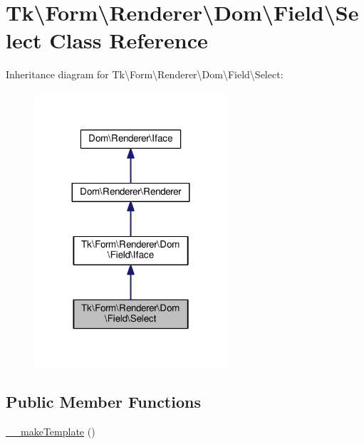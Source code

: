 \hypertarget{classTk_1_1Form_1_1Renderer_1_1Dom_1_1Field_1_1Select}{\section{Tk\textbackslash{}Form\textbackslash{}Renderer\textbackslash{}Dom\textbackslash{}Field\textbackslash{}Select Class Reference}
\label{classTk_1_1Form_1_1Renderer_1_1Dom_1_1Field_1_1Select}
}


Inheritance diagram for Tk\textbackslash{}Form\textbackslash{}Renderer\textbackslash{}Dom\textbackslash{}Field\textbackslash{}Select\+:\nopagebreak
\begin{figure}[H]
\begin{center}
\leavevmode
\includegraphics[width=203pt]{classTk_1_1Form_1_1Renderer_1_1Dom_1_1Field_1_1Select__inherit__graph}
\end{center}
\end{figure}
\subsection*{Public Member Functions}
\begin{DoxyCompactItemize}
\item 
\hyperlink{classTk_1_1Form_1_1Renderer_1_1Dom_1_1Field_1_1Select_a1ebdac96855db8bbfa6de8bd2c708f4a}{\+\_\+\+\_\+make\+Template} ()
\end{DoxyCompactItemize}
